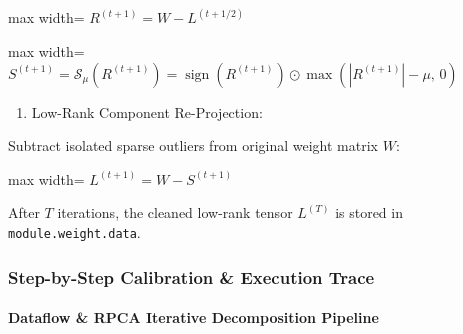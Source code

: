 \begin{center}
\begin{adjustbox}{max width=\columnwidth}
$\displaystyle
R^{(t+1)} = W - L^{(t+1/2)}
$
\end{adjustbox}
\end{center}

\begin{center}
\begin{adjustbox}{max width=\columnwidth}
$\displaystyle
S^{(t+1)} = \mathcal{S}_{\mu}\left( R^{(t+1)} \right) = \operatorname{sign}\left( R^{(t+1)} \right) \odot \max\left( \left| R^{(t+1)} \right| - \mu, \, 0 \right)
$
\end{adjustbox}
\end{center}

\begin{enumerate}
\item Low-Rank Component Re-Projection:
\end{enumerate}
Subtract isolated sparse outliers from original weight matrix $W$:

\begin{center}
\begin{adjustbox}{max width=\columnwidth}
$\displaystyle
L^{(t+1)} = W - S^{(t+1)}
$
\end{adjustbox}
\end{center}

After $T$ iterations, the cleaned low-rank tensor $L^{(T)}$ is stored in \texttt{module.weight.data}.


\subsubsection*{Step-by-Step Calibration \& Execution Trace}

\paragraph{Dataflow \& RPCA Iterative Decomposition Pipeline}

